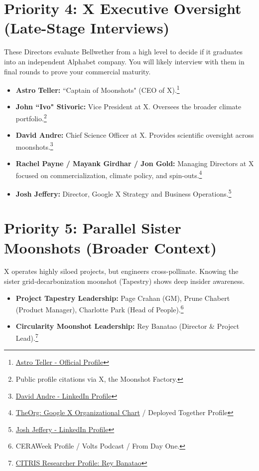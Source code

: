 \documentclass[11pt]{article}
\begin{document}
\section{Priority 4: X Executive Oversight (Late-Stage Interviews)}
These Directors evaluate Bellwether from a high level to decide if it graduates into an independent Alphabet company. You will likely interview with them in final rounds to prove your commercial maturity.
\begin{itemize}[leftmargin=*]
    \item \textbf{Astro Teller:} ``Captain of Moonshots" (CEO of X).\footnote{\href{https://www.astroteller.net/}{Astro Teller - Official Profile}}
    \item \textbf{John ``Ivo" Stivoric:} Vice President at X. Oversees the broader climate portfolio.\footnote{Public profile citations via X, the Moonshot Factory.}
    \item \textbf{David Andre:} Chief Science Officer at X. Provides scientific oversight across moonshots.\footnote{\href{https://www.linkedin.com/in/davidandre/}{David Andre - LinkedIn Profile}}
    \item \textbf{Rachel Payne / Mayank Girdhar / Jon Gold:} Managing Directors at X focused on commercialization, climate policy, and spin-outs.\footnote{\href{https://theorg.com/org/google-x}{TheOrg: Google X Organizational Chart} / Deployed Together Profile}
    \item \textbf{Josh Jeffery:} Director, Google X Strategy and Business Operations.\footnote{\href{https://www.linkedin.com/in/joshuajeffery/}{Josh Jeffery - LinkedIn Profile}}
\end{itemize}

\section{Priority 5: Parallel Sister Moonshots (Broader Context)}
X operates highly siloed projects, but engineers cross-pollinate. Knowing the sister grid-decarbonization moonshot (Tapestry) shows deep insider awareness.
\begin{itemize}[leftmargin=*]
    \item \textbf{Project Tapestry Leadership:} Page Crahan (GM), Prune Chabert (Product Manager), Charlotte Park (Head of People).\footnote{CERAWeek Profile / Volts Podcast / From Day One.}
    \item \textbf{Circularity Moonshot Leadership:} Rey Banatao (Director \& Project Lead).\footnote{\href{https://citris-uc.org/}{CITRIS Researcher Profile: Rey Banatao}}
\end{itemize}
\end{document}
